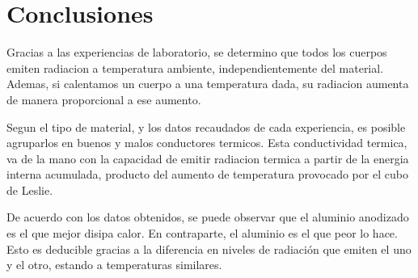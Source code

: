 \documentclass[a4paper,12pt]{report}
\begin{document}
\chapter{Conclusiones}
  Gracias a las experiencias de laboratorio, se determino que todos los cuerpos emiten radiacion a temperatura ambiente,
  independientemente del material. Ademas, si calentamos un cuerpo a una temperatura dada, su radiacion aumenta de
  manera proporcional a ese aumento.

  Segun el tipo de material, y los datos recaudados de cada experiencia, es posible agruparlos en buenos y malos
  conductores termicos. Esta conductividad termica, va de la mano con la capacidad de emitir radiacion termica a partir
  de la energia interna acumulada, producto del aumento de temperatura provocado por el cubo de Leslie.

  De acuerdo con los datos obtenidos, se puede observar que el aluminio anodizado es el que mejor disipa calor. En
  contraparte, el aluminio es el que peor lo hace. Esto es deducible gracias a la diferencia en niveles de radiación
  que emiten el uno y el otro, estando a temperaturas similares.
\end{document}

